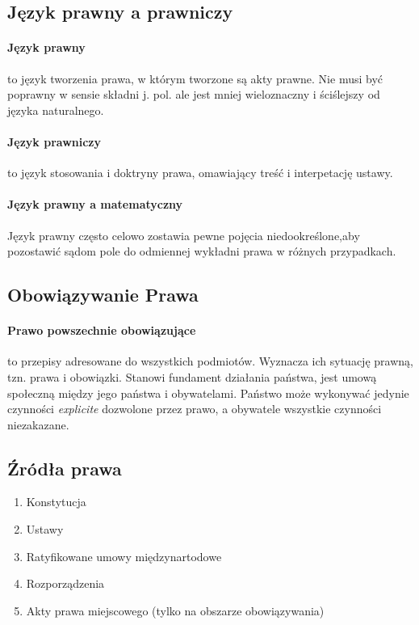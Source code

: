 \documentclass{article}
\begin{document}
\subsection{Język prawny a prawniczy}

\paragraph{Język prawny} to język tworzenia prawa, w którym tworzone są akty prawne.
Nie musi być poprawny w sensie składni j. pol. ale jest mniej wieloznaczny i ściślejszy
od języka naturalnego.

\paragraph{Język prawniczy} to język stosowania i doktryny prawa, omawiający treść
i interpetację ustawy.

\paragraph{Język prawny a matematyczny}
Język prawny często celowo zostawia pewne pojęcia niedookreślone,aby pozostawić
sądom pole do odmiennej wykładni prawa w różnych przypadkach.

\subsection{Obowiązywanie Prawa}

\paragraph{Prawo powszechnie obowiązujące} to przepisy adresowane do wszystkich podmiotów.
Wyznacza ich sytuację prawną, tzn. prawa i obowiązki.
Stanowi fundament działania państwa,
jest umową społeczną między jego państwa i obywatelami.
Państwo może wykonywać jedynie czynności \textit{explicite} dozwolone przez prawo,
a obywatele wszystkie czynności niezakazane.

\subsection{Źródła prawa}
\begin{enumerate}
  \item Konstytucja
  \item Ustawy
  \item Ratyfikowane umowy międzynartodowe
  \item Rozporządzenia
  \item Akty prawa miejscowego (tylko na obszarze obowiązywania)
\end{enumerate}
\end{document}
